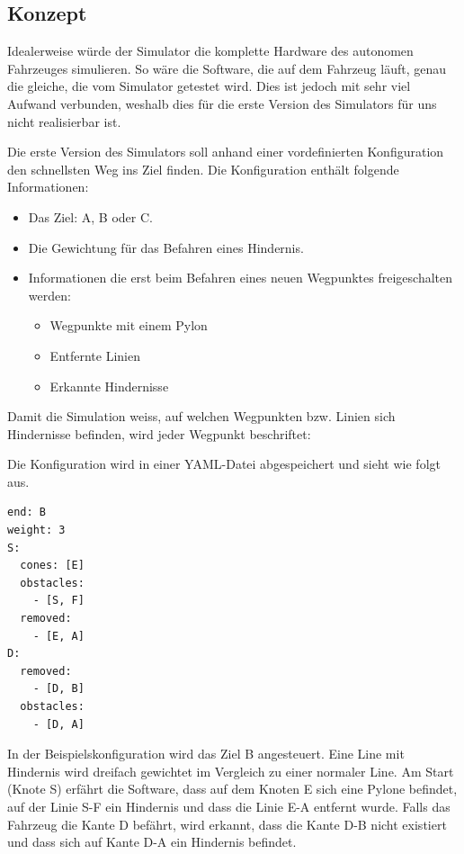 \documentclass[../main.tex]{subfiles}
\begin{document}
\subsection{Konzept}

Idealerweise würde der Simulator die komplette Hardware des autonomen Fahrzeuges simulieren. So wäre die Software, die auf dem Fahrzeug läuft, genau die gleiche, die vom Simulator getestet wird. Dies ist jedoch mit sehr viel Aufwand verbunden, weshalb dies für die erste Version des Simulators für uns nicht realisierbar ist.

Die erste Version des Simulators soll anhand einer vordefinierten Konfiguration den schnellsten Weg ins Ziel finden. Die Konfiguration enthält folgende Informationen:
\begin{itemize}
    \item Das Ziel: A, B oder C.
    \item Die Gewichtung für das Befahren eines Hindernis.
    \item Informationen die erst beim Befahren eines neuen Wegpunktes freigeschalten werden:
     \begin{itemize}
        \item{Wegpunkte mit einem Pylon}
        \item{Entfernte Linien}
        \item{Erkannte Hindernisse}
   \end{itemize}
\end{itemize}


Damit die Simulation weiss, auf welchen Wegpunkten bzw. Linien sich Hindernisse befinden, wird jeder Wegpunkt beschriftet:


Die Konfiguration wird in einer YAML-Datei abgespeichert und sieht wie folgt aus.

\begin{verbatim}
end: B
weight: 3
S:
  cones: [E]
  obstacles: 
    - [S, F] 
  removed:
    - [E, A]
D:
  removed:
    - [D, B]
  obstacles:
    - [D, A]
\end{verbatim}

In der Beispielskonfiguration wird das Ziel B angesteuert.
Eine Line mit Hindernis wird dreifach gewichtet im Vergleich zu einer normaler Line.  
Am Start (Knote S) erfährt die Software, dass auf dem Knoten E sich eine Pylone befindet,
auf der Linie S-F ein Hindernis und dass die Linie E-A entfernt wurde.
Falls das Fahrzeug die Kante D befährt, wird erkannt, dass die Kante D-B nicht existiert und dass sich auf Kante D-A ein Hindernis befindet.
\end{document}
